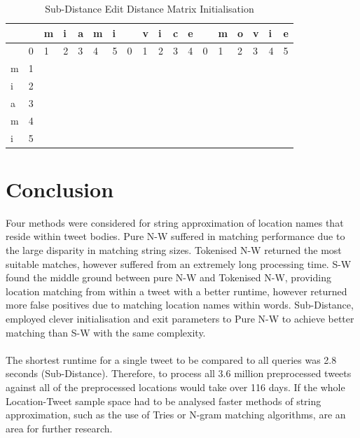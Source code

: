 \documentclass[11pt,a4paper]{article}
\begin{document}
\begin{table}[ht]
	\centering
	\caption{Sub-Distance Edit Distance Matrix Initialisation}
    \begin{tabular}{l|lllllllllllllllll}
    ~ & ~ & m & i & a & m & i & ~ & v & i & c & e & ~ & m & o & v & i & e \\
    \hline
    ~ & 0 & 1 & 2 & 3 & 4 & 5 & 0 & 1 & 2 & 3 & 4 & 0 & 1 & 2 & 3 & 4 & 5 \\
    m & 1 & ~ & ~ & ~ & ~ & ~ & ~ & ~ & ~ & ~ & ~ & ~ & ~ & ~ & ~ & ~ & ~ \\
    i & 2 & ~ & ~ & ~ & ~ & ~ & ~ & ~ & ~ & ~ & ~ & ~ & ~ & ~ & ~ & ~ & ~ \\
    a & 3 & ~ & ~ & ~ & ~ & ~ & ~ & ~ & ~ & ~ & ~ & ~ & ~ & ~ & ~ & ~ & ~ \\
    m & 4 & ~ & ~ & ~ & ~ & ~ & ~ & ~ & ~ & ~ & ~ & ~ & ~ & ~ & ~ & ~ & ~ \\
    i & 5 & ~ & ~ & ~ & ~ & ~ & ~ & ~ & ~ & ~ & ~ & ~ & ~ & ~ & ~ & ~ & ~ \\
    \end{tabular}
    \label{table:subdist}
\end{table}


\section{Conclusion}

Four methods were considered for string approximation of location names that reside within tweet bodies. Pure N-W suffered in matching performance due to the large disparity in matching string sizes. Tokenised N-W returned the most suitable matches, however suffered from an extremely long processing time. S-W found the middle ground between pure N-W and Tokenised N-W, providing location matching from within a tweet with a better runtime, however returned more false positives due to matching location names within words. Sub-Distance, employed clever initialisation and exit parameters to Pure N-W to achieve better matching than S-W with the same complexity.\\\\
The shortest runtime for a single tweet to be compared to all queries was 2.8 seconds (Sub-Distance). Therefore, to process all 3.6 million preprocessed tweets against all of the preprocessed locations would take over 116 days. If the whole Location-Tweet sample space had to be analysed faster methods of string approximation, such as the use of Tries or N-gram matching algorithms, are an area for further research. 
\end{document}
